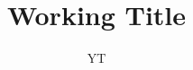 \documentclass[11pt, a4paper]{article}
\title{Working Title}
\author{YT}
\begin{document}
\maketitle

\begin{abstract}
  
\end{abstract}







\printbibliography{}
\end{document}
